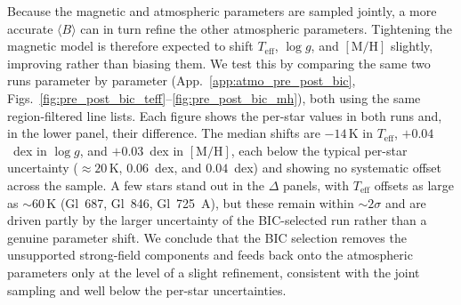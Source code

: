 Because the magnetic and atmospheric parameters are sampled jointly, a more accurate $\langle B\rangle$ can in turn refine the other atmospheric parameters. Tightening the magnetic model is therefore expected to shift $T_\mathrm{eff}$, $\log g$, and $[\mathrm{M/H}]$ slightly, improving rather than biasing them. We test this by comparing the same two runs parameter by parameter (App.~\ref{app:atmo_pre_post_bic}, Figs.~\ref{fig:pre_post_bic_teff}--\ref{fig:pre_post_bic_mh}), both using the same region-filtered line lists. Each figure shows the per-star values in both runs and, in the lower panel, their difference. The median shifts are $-14\,\mathrm{K}$ in $T_\mathrm{eff}$, $+0.04$~dex in $\log g$, and $+0.03$~dex in $[\mathrm{M/H}]$, each below the typical per-star uncertainty ($\approx20\,\mathrm{K}$, $0.06$~dex, and $0.04$~dex) and showing no systematic offset across the sample. A few stars stand out in the $\Delta$ panels, with $T_\mathrm{eff}$ offsets as large as $\sim60\,\mathrm{K}$ (Gl~687, Gl~846, Gl~725~A), but these remain within $\sim2\sigma$ and are driven partly by the larger uncertainty of the BIC-selected run rather than a genuine parameter shift. We conclude that the BIC selection removes the unsupported strong-field components and feeds back onto the atmospheric parameters only at the level of a slight refinement, consistent with the joint sampling and well below the per-star uncertainties.



